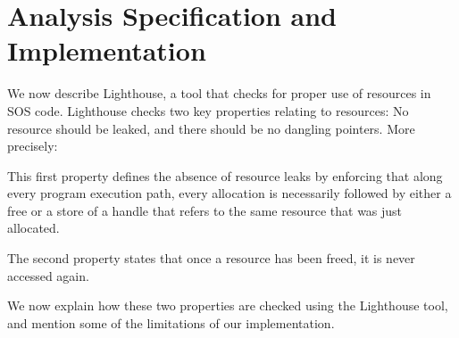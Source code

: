 \section{Analysis Specification and Implementation}
\label{sec:alg}

We now describe Lighthouse, a tool that checks for proper use of resources
in SOS code.
Lighthouse checks two key properties relating to resources:  No
resource should be leaked, and there should be no dangling pointers.
More precisely:

\smallskip{} This first property defines the
absence of resource leaks by enforcing that along every program
execution path, every allocation is necessarily followed by either a
free or a store of a handle that refers to the same resource that was
just allocated.

\smallskip{} The second property
states that once a resource has been freed, it is never accessed
again.

We now explain how these two properties are checked using the
Lighthouse tool, and mention some of the limitations of our implementation.

